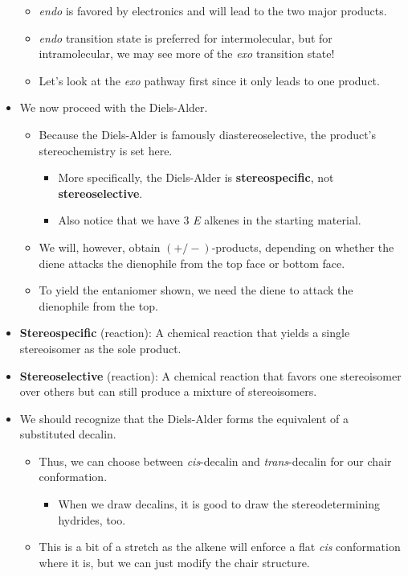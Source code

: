\documentclass[../notes.tex]{subfiles}
\begin{document}
\begin{itemize}
\begin{itemize}
        \item \emph{endo} is favored by electronics and will lead to the two major products.
        \item \emph{endo} transition state is preferred for intermolecular, but for intramolecular, we may see more of the \emph{exo} transition state!
        \item Let's look at the \emph{exo} pathway first since it only leads to one product.
    \end{itemize}
    \item We now proceed with the Diels-Alder.
    \begin{itemize}
        \item Because the Diels-Alder is famously diastereoselective, the product's stereochemistry is set here.
        \begin{itemize}
            \item More specifically, the Diels-Alder is \textbf{stereospecific}, not \textbf{stereoselective}.
            \item Also notice that we have 3 \emph{E} alkenes in the starting material.
        \end{itemize}
        \item We will, however, obtain $(+/-)$-products, depending on whether the diene attacks the dienophile from the top face or bottom face.
        \item To yield the entaniomer shown, we need the diene to attack the dienophile from the top.
    \end{itemize}
    \item \textbf{Stereospecific} (reaction): A chemical reaction that yields a single stereoisomer as the sole product.
    \item \textbf{Stereoselective} (reaction): A chemical reaction that favors one stereoisomer over others but can still produce a mixture of stereoisomers.
    \item We should recognize that the Diels-Alder forms the equivalent of a substituted decalin.
    \begin{itemize}
        \item Thus, we can choose between \emph{cis}-decalin and \emph{trans}-decalin for our chair conformation.
        \begin{itemize}
            \item When we draw decalins, it is good to draw the stereodetermining hydrides, too.
        \end{itemize}
        \item This is a bit of a stretch as the alkene will enforce a flat \emph{cis} conformation where it is, but we can just modify the chair structure.

\end{itemize}
\end{itemize}
\end{document}
